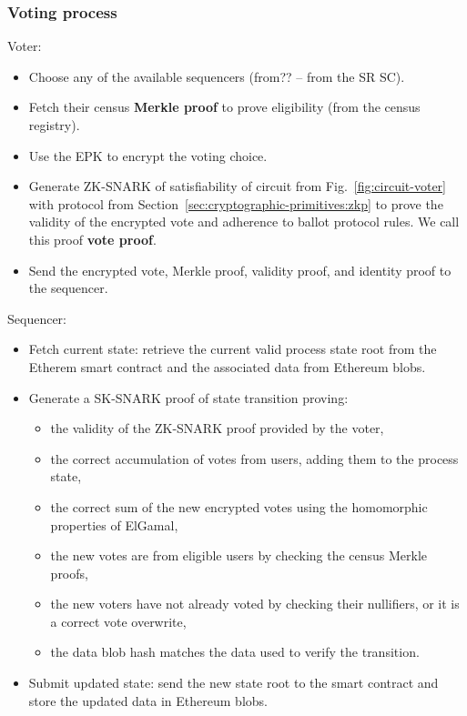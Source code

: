 \subsubsection{Voting process}
\label{sec:vocdoni-protocol:voting}

Voter:

\begin{itemize}
	\item Choose any of the available sequencers (from?? -- from the SR SC).
	\item Fetch their census \textbf{Merkle proof} to prove eligibility (from the census registry).
	\item Use the EPK to encrypt the voting choice.
	\item Generate ZK-SNARK of satisfiability of circuit from Fig.~\ref{fig:circuit-voter} with protocol from Section~\ref{sec:cryptographic-primitives:zkp} to prove the validity of the encrypted vote and adherence to ballot protocol rules. We call this proof \textbf{vote proof}.
	\item Send the encrypted vote, Merkle proof, validity proof, and identity proof to the sequencer.
\end{itemize}

Sequencer:

\begin{itemize}
	\item Fetch current state: retrieve the current valid process state root from the Etherem smart contract and the associated data from Ethereum blobs.
	\item Generate a SK-SNARK proof of state transition proving:
		\begin{itemize}
			\item the validity of the ZK-SNARK proof provided by the voter,
			\item the correct accumulation of votes from users, adding them to the process state,
			\item the correct sum of the new encrypted votes using the homomorphic properties of ElGamal,
			\item the new votes are from eligible users by checking the census Merkle proofs,
			\item the new voters have not already voted by checking their nullifiers, or it is a correct vote overwrite,
			\item the data blob hash matches the data used to verify the transition.
		\end{itemize}
	\item Submit updated state: send the new state root to the smart contract and store the updated data in Ethereum blobs.
\end{itemize}


